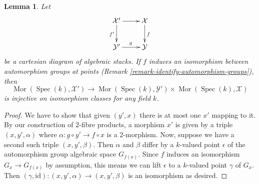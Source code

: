 \documentclass[10pt,a4paper]{amsart}
\theoremstyle{plain}
\newtheorem{lemma}[subsection]{Lemma}
\theoremstyle{definition}
\theoremstyle{remark}
\numberwithin{equation}{subsection}
\def\Spec{\mathop{\mathrm{Spec}}}
\def\Mor{\mathop{\mathrm{Mor}}\nolimits}
\begin{document}
\begin{lemma}
\label{lemma-stabilizer-preserving-points-cartesian}
Let
$$
\xymatrix{
\mathcal{X}' \ar[r] \ar[d]_{f'} & \mathcal{X} \ar[d]^f \\
\mathcal{Y}' \ar[r]^g & \mathcal{Y}
}
$$
be a cartesian diagram of algebraic stacks. If $f$ induces an isomorphism
between automorphism groups at points
(Remark \ref{remark-identify-automorphism-groups}),
then
$$
\Mor(\Spec(k), \mathcal{X}')
\longrightarrow
\Mor(\Spec(k), \mathcal{Y}') \times \Mor(\Spec(k), \mathcal{X})
$$
is injective on isomorphism classes for any field $k$.
\end{lemma}

\begin{proof}
We have to show that given $(y', x)$ there is at most one $x'$
mapping to it.
By our construction of $2$-fibre products, a morphism
$x'$ is given by a triple $(x, y', \alpha)$
where  $\alpha : g \circ y' \to f \circ x$ is a $2$-morphism.
Now, suppose we have a second such triple $(x, y', \beta)$.
Then $\alpha$ and $\beta$ differ by a $k$-valued point
$\epsilon$ of the automorphism group algebraic space $G_{f(x)}$.
Since $f$ induces an isomorphism $G_x \to G_{f(x)}$ by
assumption, this means we can lift $\epsilon$ to a $k$-valued point
$\gamma$ of $G_x$. Then $(\gamma, \text{id}) : (x, y', \alpha) \to
(x, y', \beta)$ is an isomorphism as desired.
\end{proof}
\end{document}
